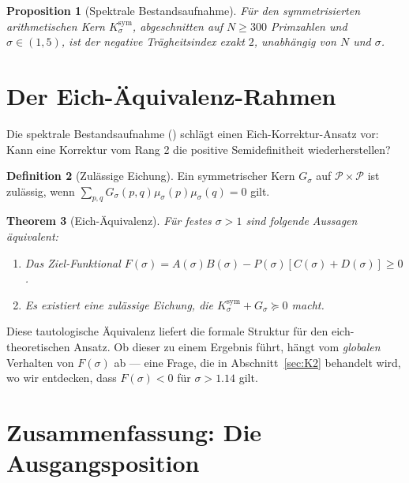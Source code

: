 \documentclass[12pt,a4paper]{article}
\newtheorem{theorem}{Theorem}[section]
\newtheorem{proposition}[theorem]{Proposition}
\theoremstyle{definition}
\newtheorem{definition}[theorem]{Definition}
\theoremstyle{remark}
\newcommand{\Ksym}{K_\sigma^{\mathrm{sym}}}
\newcommand{\muG}{\mu_\sigma}
\newcommand{\PP}{\mathcal{P}}
\begin{document}
\begin{proposition}[Spektrale Bestandsaufnahme]
\label{prop:spectral-census}
Für den symmetrisierten arithmetischen Kern $\Ksym$, abgeschnitten auf $N \geq 300$ Primzahlen und $\sigma \in (1, 5)$, ist der negative Trägheitsindex exakt $2$, unabhängig von $N$ und $\sigma$.
\end{proposition}


\section{Der Eich-Äquivalenz-Rahmen}
\label{sec:gauge}

Die spektrale Bestandsaufnahme () schlägt einen Eich-Korrektur-Ansatz vor: Kann eine Korrektur vom Rang 2 die positive Semidefinitheit wiederherstellen?

\begin{definition}[Zulässige Eichung]
Ein symmetrischer Kern $G_\sigma$ auf $\PP \times \PP$ ist zulässig, wenn $\sum_{p,q}G_\sigma(p,q)\muG(p)\muG(q) = 0$ gilt.
\end{definition}

\begin{theorem}[Eich-Äquivalenz]
\label{thm:gauge}
Für festes $\sigma > 1$ sind folgende Aussagen äquivalent:
\begin{enumerate}[label=(\roman*)]
  \item Das Ziel-Funktional $F(\sigma) = A(\sigma)B(\sigma) - P(\sigma)[C(\sigma)+D(\sigma)] \geq 0$.
  \item Es existiert eine zulässige Eichung, die $\Ksym + G_\sigma \succeq 0$ macht.
\end{enumerate}
\end{theorem}

Diese tautologische Äquivalenz liefert die formale Struktur für den eich-theoretischen Ansatz. Ob dieser zu einem Ergebnis führt, hängt vom \emph{globalen} Verhalten von $F(\sigma)$ ab --- eine Frage, die in Abschnitt~\ref{sec:K2} behandelt wird, wo wir entdecken, dass $F(\sigma) < 0$ für $\sigma > 1.14$ gilt.


\section{Zusammenfassung: Die Ausgangsposition}
\label{sec:summary}
\end{document}

